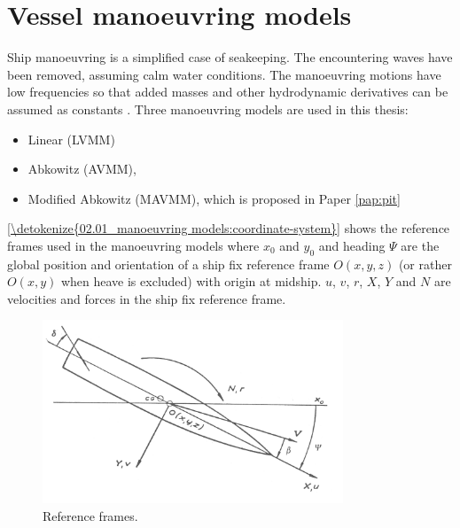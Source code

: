 \section{Vessel manoeuvring models} \label{sec:manoeuvring model}
\label{\detokenize{02.01_manoeuvring models:vessel-manoeuvring-models}}\label{\detokenize{02.01_manoeuvring models:vmm}}\label{\detokenize{02.01_manoeuvring models::doc}}
Ship manoeuvring is a simplified case of seakeeping. The encountering waves have been removed, assuming calm water conditions. The manoeuvring motions have low frequencies so that added masses and other hydrodynamic derivatives can be assumed as constants  \cite{fossen_handbook_2021}. Three manoeuvring models are used in this thesis: 
\begin{itemize}
    \item Linear (LVMM) \cite{matusiak_dynamics_2021}
    \item Abkowitz (AVMM), \cite{abkowitz_ship_1964}
    \item Modified Abkowitz (MAVMM), which is proposed in Paper \ref{pap:pit}
\end{itemize}

\noindent\autoref{\detokenize{02.01_manoeuvring models:coordinate-system}} shows the reference frames used in the manoeuvring models where \(x_0\) and \(y_0\) and heading \(\Psi\) are the global position and orientation of a ship fix reference frame \(O(x,y,z)\) (or rather \(O(x,y)\) when heave is excluded) with origin at midship. \(u\), \(v\), \(r\), \(X\), \(Y\) and \(N\) are velocities and forces in the ship fix reference frame.



\begin{figure}[H]
    \centering
    \includegraphics[width=0.8\textwidth]{kappa/images/coordinate_system.PNG}
    \caption{Reference frames.}
    \label{\detokenize{02.01_manoeuvring models:coordinate-system}}
\end{figure}

